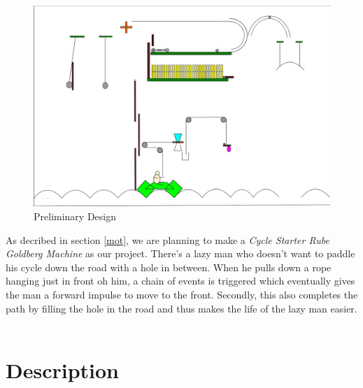 \documentclass[12pt,a4paper]{article}
\begin{document}
\begin{figure}[ht!]
\centering
\includegraphics[scale=0.45]{mbox2d.png}
\caption{Preliminary Design \label{img}}
\end{figure} 
As decribed in section \ref{mot}, we are planning to make a \textit{Cycle Starter Rube Goldberg Machine} as our project. There's a lazy man who doesn't want to paddle his cycle down the road with a hole in between. When he pulls down a rope hanging just in front oh him, a chain of events is triggered which eventually gives the man a forward impulse to move to the front. Secondly, this also completes the path by filling the hole in the road and thus makes the life of the lazy man easier.\\ \\


\section{Description} \label{desp}
\end{document}
